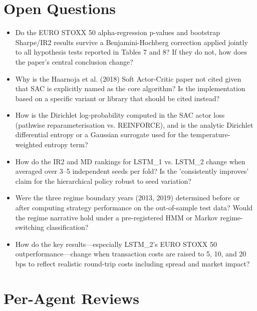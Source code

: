 \documentclass[11pt]{article}
\begin{document}
\section*{Open Questions}
\begin{itemize}[leftmargin=*]
  \item Do the EURO STOXX 50 alpha-regression p-values and bootstrap Sharpe/IR2 results survive a Benjamini-Hochberg correction applied jointly to all hypothesis tests reported in Tables 7 and 8? If they do not, how does the paper's central conclusion change?
  \item Why is the Haarnoja et al. (2018) Soft Actor-Critic paper not cited given that SAC is explicitly named as the core algorithm? Is the implementation based on a specific variant or library that should be cited instead?
  \item How is the Dirichlet log-probability computed in the SAC actor loss (pathwise reparameterisation vs. REINFORCE), and is the analytic Dirichlet differential entropy or a Gaussian surrogate used for the temperature-weighted entropy term?
  \item How do the IR2 and MD rankings for LSTM\_1 vs. LSTM\_2 change when averaged over 3–5 independent seeds per fold? Is the 'consistently improves' claim for the hierarchical policy robust to seed variation?
  \item Were the three regime boundary years (2013, 2019) determined before or after computing strategy performance on the out-of-sample test data? Would the regime narrative hold under a pre-registered HMM or Markov regime-switching classification?
  \item How do the key results—especially LSTM\_2's EURO STOXX 50 outperformance—change when transaction costs are raised to 5, 10, and 20 bps to reflect realistic round-trip costs including spread and market impact?
\end{itemize}

\section*{Per-Agent Reviews}
\end{document}
